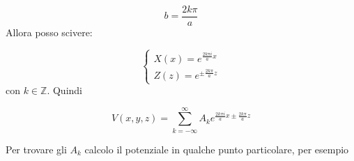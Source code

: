 \documentclass[../main.tex]{subfiles}
\begin{document}
\begin{equation}
  b=\frac{2k \pi}{a}
\end{equation}
Allora posso scivere:

\begin{equation}
  \left\{
    \begin{aligned}
      X(x)=e^{\frac{2 k \pi i}{a}x} \\
      Z(z)=e^{\pm \frac{2 k \pi}{a}z}
    \end{aligned}
  \right.
\end{equation}
con $k\in \mathbb Z$. Quindi

\begin{equation}
  V(x,y,z)=\sum_{k=-\infty}^\infty A_k e^{\frac{2 k \pi i}{a} x \pm \frac{2 k \pi}{a} z }
\end{equation}

Per trovare gli $A_k$ calcolo il potenziale in qualche punto particolare, per esempio
\end{document}
